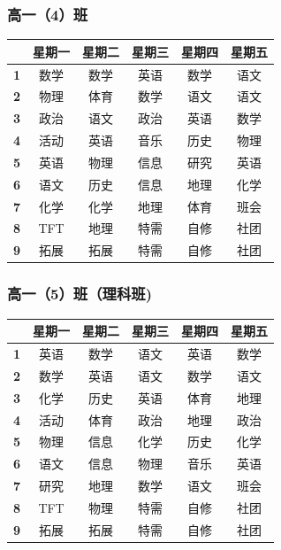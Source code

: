 \documentclass[a4paper]{article}
\begin{document}
  \clearpage

  \subsubsection{高一（4）班}

   \begin{tabular}{cccccc}
   \toprule
   & \bf 星期一 & \bf 星期二 & \bf 星期三 & \bf 星期四 & \bf 星期五 \\
   \midrule
   \bf 1 & 数学 & 数学 & 英语 & 数学 & 语文 \\
   \bf 2 & 物理 & 体育 & 数学 & 语文 & 语文 \\
   \bf 3 & 政治 & 语文 & 政治 & 英语 & 数学 \\
   \bf 4 & 活动 & 英语 & 音乐 & 历史 & 物理 \\
   \bf 5 & 英语 & 物理 & 信息 & 研究 & 英语 \\
   \midrule
   \bf 6 & 语文 & 历史 & 信息 & 地理 & 化学 \\
   \bf 7 & 化学 & 化学 & 地理 & 体育 & 班会 \\
   \bf 8 & TFT  & 地理 & 特需 & 自修 & 社团 \\
   \bf 9 & 拓展 & 拓展 & 特需 & 自修 & 社团 \\
   \bottomrule
   \end{tabular}

  \subsubsection{高一（5）班（理科班)}

   \begin{tabular}{cccccc}
   \toprule
   & \bf 星期一 & \bf 星期二 & \bf 星期三 & \bf 星期四 & \bf 星期五 \\
   \midrule
   \bf 1 & 英语 & 数学 & 语文 & 英语 & 数学 \\
   \bf 2 & 数学 & 英语 & 语文 & 数学 & 语文 \\
   \bf 3 & 化学 & 历史 & 英语 & 体育 & 地理 \\
   \bf 4 & 活动 & 体育 & 政治 & 地理 & 政治 \\
   \bf 5 & 物理 & 信息 & 化学 & 历史 & 化学 \\
   \midrule
   \bf 6 & 语文 & 信息 & 物理 & 音乐 & 英语 \\
   \bf 7 & 研究 & 地理 & 数学 & 语文 & 班会 \\
   \bf 8 & TFT  & 物理 & 特需 & 自修 & 社团 \\
   \bf 9 & 拓展 & 拓展 & 特需 & 自修 & 社团 \\
   \bottomrule
   \end{tabular}
\end{document}
